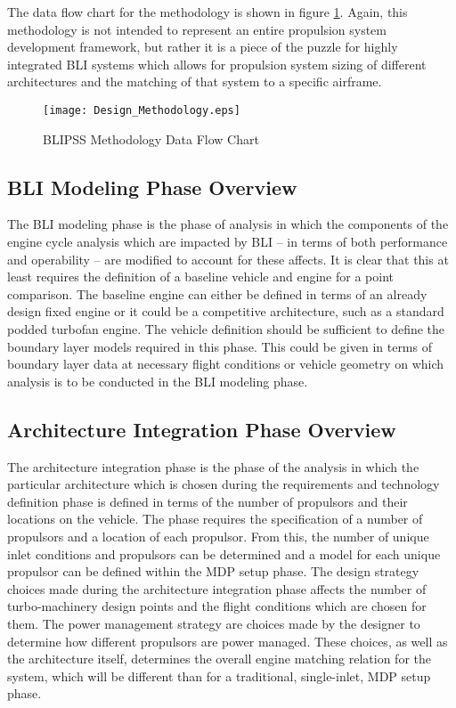 		The data flow chart for the methodology is shown in figure \ref{Design_Methodology}.  Again, this methodology is not intended to represent an entire propulsion system development framework, but rather it is a piece of the puzzle for highly integrated BLI systems which allows for propulsion system sizing of different architectures and the matching of that system to a specific airframe.
		 
			\begin{figure}[htp]
				\centering
				\texttt{[image: Design\_Methodology.eps]}
				\caption{BLIPSS Methodology Data Flow Chart}
				\label{Design_Methodology}
			\end{figure}
			
		\subsection{BLI Modeling Phase Overview}
			The BLI modeling phase is the phase of analysis in which the components of the engine cycle analysis which are impacted by BLI -- in terms of both performance and operability -- are modified to account for these affects.  It is clear that this at least requires the definition of a baseline vehicle and engine for a point comparison.  The baseline engine can either be defined in terms of an already design fixed engine or it could be a competitive architecture, such as a standard podded turbofan engine.  The vehicle definition should be sufficient to define the boundary layer models required in this phase.  This could be given in terms of boundary layer data at necessary flight conditions or vehicle geometry on which analysis is to be conducted in the BLI modeling phase.  
			
		\subsection{Architecture Integration Phase Overview}
			The architecture integration phase is the phase of the analysis in which the particular architecture which is chosen during the requirements and technology definition phase is defined in terms of the number of propulsors and their locations on the vehicle.  The phase requires the specification of a number of propulsors and a location of each propulsor.  From this, the number of unique inlet conditions and propulsors can be determined and a model for each unique propulsor can be defined within the MDP setup phase.  The design strategy choices made during the architecture integration phase affects the number of turbo-machinery design points and the flight conditions which are chosen for them.  The power management strategy are choices made by the designer to determine how different propulsors are power managed.  These choices, as well as the architecture itself, determines the overall engine matching relation for the system, which will be different than for a traditional, single-inlet, MDP setup phase.
						
